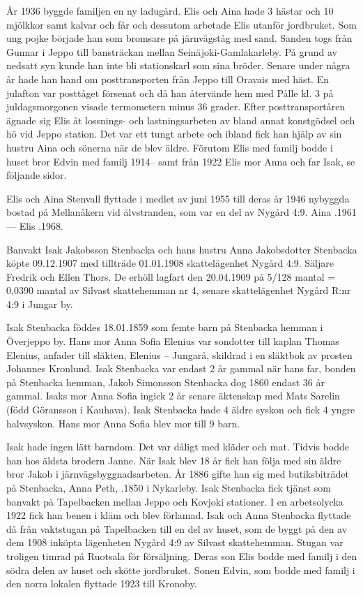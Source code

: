 År 1936 byggde familjen en ny ladugård. Elis och Aina hade 3 hästar och 10 mjölkkor samt kalvar och får och dessutom arbetade Elis utanför jordbruket. Som ung pojke började han som bromsare på järnvägståg med sand. Sanden togs från Gunnar i Jeppo till bansträckan mellan Seinäjoki-Gamlakarleby. På grund av nedsatt syn kunde han inte bli stationskarl som sina bröder. Senare under några år hade han hand om posttransporten från Jeppo till Oravais med häst. En julafton var posttåget försenat och då han återvände hem med Pålle kl. 3 på juldagsmorgonen visade termometern minus 36 grader.  Efter posttransportåren ägnade sig Elis åt lossnings- och lastningsarbeten av bland annat konstgödsel och hö vid Jeppo station. Det var ett tungt arbete och ibland fick han hjälp av sin hustru Aina och sönerna när de blev äldre.
Förutom Elis med familj bodde i huset bror Edvin med familj 1914-- samt från 1922 Elis mor Anna och far Isak, se följande sidor.

Elis och Aina Stenvall flyttade i medlet av juni 1955 till deras år 1946 nybyggda bostad på Mellanåkern vid älvstranden, som var en del av Nygård 4:9. Aina .1961  ---  Elis .1968.


%
Banvakt Isak Jakobsson Stenbacka och hans hustru Anna Jakobsdotter Stenbacka köpte 09.12.1907 med tillträde 01.01.1908 skattelägenhet Nygård 4:9. Säljare Fredrik och Ellen Thors. De erhöll lagfart den 20.04.1909 på 5/128 mantal = 0,0390 mantal av Silvast skattehemman nr 4, senare skattelägenhet Nygård R:nr 4:9 i Jungar by.

Isak Stenbacka föddes 18.01.1859 som femte barn på Stenbacka hemman i Överjeppo by. Hans mor Anna Sofia Elenius var sondotter till kaplan Thomas Elenius, anfader till släkten, Elenius – Jungarå, skildrad i en släktbok av prosten Johannes Kronlund. Isak Stenbacka var endast 2 år gammal när hans far, bonden på Stenbacka hemman, Jakob Simonsson Stenbacka dog 1860 endast 36 år gammal. Isaks mor Anna Sofia ingick 2 år senare äktenskap med Mats Sarelin (född Göransson i Kauhava). Isak Stenbacka hade 4 äldre syskon och fick 4 yngre halvsyskon. Hans mor Anna Sofia blev mor till 9 barn.

Isak hade ingen lätt barndom. Det var dåligt med kläder och mat. Tidvis bodde han hos äldsta brodern Janne. När Isak blev 18 år fick han följa med sin äldre bror Jakob i järnvägsbyggnadsarbeten. År 1886 gifte han sig med butiksbiträdet på Stenbacka, Anna Peth, .1850 i Nykarleby. Isak Stenbacka fick tjänst som banvakt på Tapelbacken mellan Jeppo och Kovjoki stationer. I en arbetsolycka 1922 fick han benen i kläm och blev förlamad. Isak och Anna Stenbacka flyttade då från vaktstugan på Tapelbacken till en del av huset, som de byggt på den av dem 1908 inköpta lägenheten Nygård 4:9 av Silvast skattehemman. Stugan var troligen timrad på Ruotsala för försäljning. Deras son Elis bodde med familj i den södra delen av huset och skötte jordbruket. Sonen Edvin, som bodde med familj i den norra lokalen flyttade 1923 till Kronoby.

